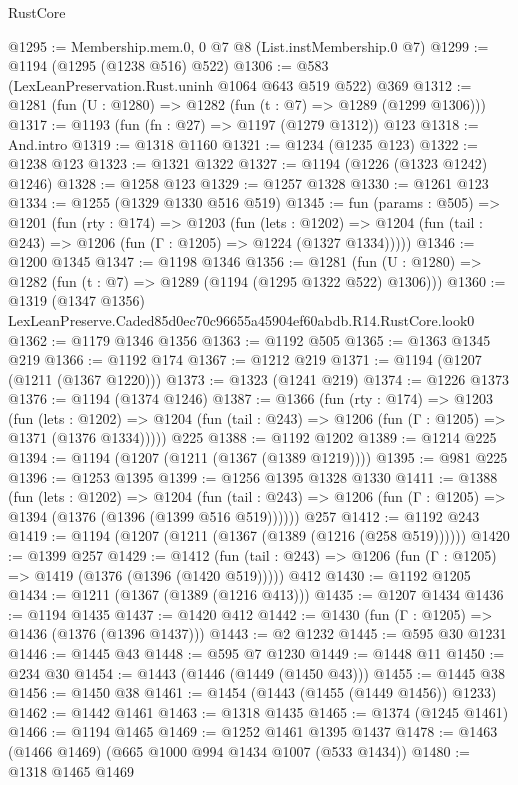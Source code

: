 \begin{lexlean}{RustCore}
\begin{coremodule}
@1295 := Membership.mem.{0, 0} @7 @8 (List.instMembership.{0} @7)
@1299 := @1194 (@1295 (@1238 @516) @522)
@1306 := @583 (LexLeanPreservation.Rust.uninh @1064 @643 @519 @522) @369
@1312 := @1281 (fun (U : @1280) => @1282 (fun (t : @7) => @1289 (@1299 @1306)))
@1317 := @1193 (fun (fn : @27) => @1197 (@1279 @1312)) @123
@1318 := And.intro
@1319 := @1318 @1160
@1321 := @1234 (@1235 @123)
@1322 := @1238 @123
@1323 := @1321 @1322
@1327 := @1194 (@1226 (@1323 @1242) @1246)
@1328 := @1258 @123
@1329 := @1257 @1328
@1330 := @1261 @123
@1334 := @1255 (@1329 @1330 @516 @519)
@1345 := fun (params : @505) =>
  @1201
    (fun (rty : @174) =>
    @1203
      (fun (lets : @1202) =>
      @1204 (fun (tail : @243) => @1206 (fun (Γ : @1205) => @1224 (@1327 @1334)))))
@1346 := @1200 @1345
@1347 := @1198 @1346
@1356 := @1281 (fun (U : @1280) => @1282 (fun (t : @7) => @1289 (@1194 (@1295 @1322 @522) @1306)))
@1360 := @1319 (@1347 @1356) LexLeanPreserve.Caded85d0ec70c96655a45904ef60abdb.R14.RustCore.look0
@1362 := @1179 @1346 @1356
@1363 := @1192 @505
@1365 := @1363 @1345 @219
@1366 := @1192 @174
@1367 := @1212 @219
@1371 := @1194 (@1207 (@1211 (@1367 @1220)))
@1373 := @1323 (@1241 @219)
@1374 := @1226 @1373
@1376 := @1194 (@1374 @1246)
@1387 := @1366
    (fun (rty : @174) =>
    @1203
      (fun (lets : @1202) =>
      @1204 (fun (tail : @243) => @1206 (fun (Γ : @1205) => @1371 (@1376 @1334)))))
    @225
@1388 := @1192 @1202
@1389 := @1214 @225
@1394 := @1194 (@1207 (@1211 (@1367 (@1389 @1219))))
@1395 := @981 @225
@1396 := @1253 @1395
@1399 := @1256 @1395 @1328 @1330
@1411 := @1388
    (fun (lets : @1202) =>
    @1204 (fun (tail : @243) => @1206 (fun (Γ : @1205) => @1394 (@1376 (@1396 (@1399 @516 @519))))))
    @257
@1412 := @1192 @243
@1419 := @1194 (@1207 (@1211 (@1367 (@1389 (@1216 (@258 @519))))))
@1420 := @1399 @257
@1429 := @1412
    (fun (tail : @243) => @1206 (fun (Γ : @1205) => @1419 (@1376 (@1396 (@1420 @519)))))
    @412
@1430 := @1192 @1205
@1434 := @1211 (@1367 (@1389 (@1216 @413)))
@1435 := @1207 @1434
@1436 := @1194 @1435
@1437 := @1420 @412
@1442 := @1430 (fun (Γ : @1205) => @1436 (@1376 (@1396 @1437)))
@1443 := @2 @1232
@1445 := @595 @30 @1231
@1446 := @1445 @43
@1448 := @595 @7 @1230
@1449 := @1448 @11
@1450 := @234 @30
@1454 := @1443 (@1446 (@1449 (@1450 @43)))
@1455 := @1445 @38
@1456 := @1450 @38
@1461 := @1454 (@1443 (@1455 (@1449 @1456)) @1233)
@1462 := @1442 @1461
@1463 := @1318 @1435
@1465 := @1374 (@1245 @1461)
@1466 := @1194 @1465
@1469 := @1252 @1461 @1395 @1437
@1478 := @1463 (@1466 @1469) (@665 @1000 @994 @1434 @1007 (@533 @1434))
@1480 := @1318 @1465 @1469

\end{coremodule}
\end{lexlean}
